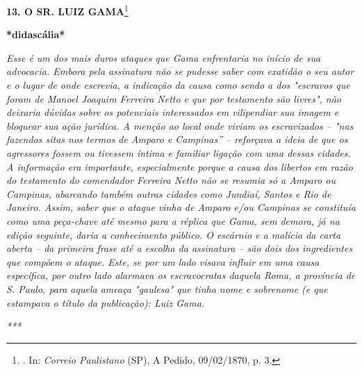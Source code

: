 \textbf{13. O SR. LUIZ GAMA}\footnote{. In: \emph{Correio Paulistano}
  (SP), A Pedido, 09/02/1870, p. 3.}

\textbf{*didascália*}

\emph{Esse é um dos mais duros ataques que Gama enfrentaria no início de
sua advocacia. Embora pela assinatura não se pudesse saber com exatidão
o seu autor e o lugar de onde escrevia, a indicação da causa como sendo
a dos "escravos que foram de Manoel Joaquim Ferreira Netto e que por
testamento são livres", não deixaria dúvidas sobre os potenciais
interessados em vilipendiar sua imagem e bloquear sua ação jurídica. A
menção ao local onde viviam os escravizados -- "nas fazendas sitas nos
termos de Amparo e Campinas'' -- reforçava a ideia de que os agressores
fossem ou tivessem íntima e familiar ligação com uma dessas cidades. A
informação era importante, especialmente porque a causa dos libertos em
razão do testamento do comendador Ferreira Netto não se resumia só a
Amparo ou Campinas, abarcando também outras cidades como Jundiaí, Santos
e Rio de Janeiro. Assim, saber que o ataque vinha de Amparo e/ou
Campinas se constituía como uma peça-chave até mesmo para a réplica que
Gama, sem demora, já na edição seguinte, daria a conhecimento público. O
escárnio e a malícia da carta aberta -- da primeira frase até a escolha
da assinatura -- são dois dos ingredientes que compõem o ataque. Este,
se por um lado visava influir em uma causa específica, por outro lado
alarmava os escravocratas daquela Roma, a província de S. Paulo, para
aquela ameaça "gaulesa" que tinha nome e sobrenome (e que estampava o
título da publicação): Luiz Gama.}

\emph{***}

